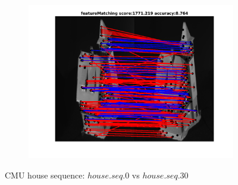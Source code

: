 \documentclass[
	fontsize=12pt,
	paper=a4,
	twoside=false,
	numbers=noenddot,
	plainheadsepline,
	toc=listof,
	toc=bibliography
]{scrartcl}
\begin{document}
\begin{figure}[h]
\begin{subfigure}[b]{0.3\textwidth}
		\includegraphics[scale=0.25]{"fig_ver2608/RealImages/HouseSeq/no_descr/using_cpd_afftrafo/solution/fi_4_featureMatching"}  
	\end{subfigure} 		
	\caption{CMU house sequence: $house.seq.0$ vs $house.seq.30$}
\end{figure}
\vspace{-20pt}
\end{document}
